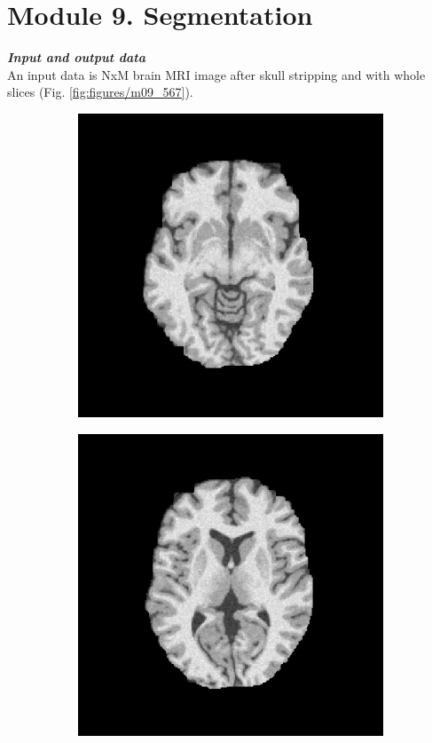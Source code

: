 \section{Module 9. Segmentation}

\textbf{\textit{Input and output data}} \\
An input data is NxM brain MRI image after skull stripping and with whole slices (Fig. \ref{fig:figures/m09_567}).\\

\begin{figure}[H]
	\centering
	\begin{subfigure}[b]{0.25\linewidth}
		\includegraphics[width=\linewidth]{figures/Module_09/m09_5}
	\end{subfigure}
		\begin{subfigure}[b]{0.25\linewidth}
		\includegraphics[width=\linewidth]{figures/Module_09/m09_6}

\end{subfigure}
\end{figure}
